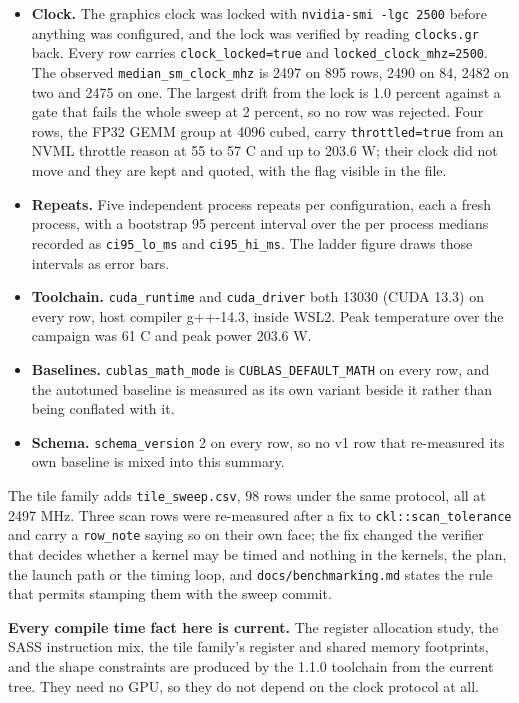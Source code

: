 \begin{itemize}
  \item \textbf{Clock.} The graphics clock was locked with
    \texttt{nvidia-smi -lgc 2500} before anything was configured, and the lock was
    verified by reading \texttt{clocks.gr} back. Every row carries
    \texttt{clock\_locked=true} and \texttt{locked\_clock\_mhz=2500}. The observed
    \texttt{median\_sm\_clock\_mhz} is 2497 on 895 rows, 2490 on 84, 2482 on two
    and 2475 on one. The largest drift from the lock is 1.0 percent against a gate
    that fails the whole sweep at 2 percent, so no row was rejected. Four rows, the
    FP32 GEMM group at 4096 cubed, carry \texttt{throttled=true} from an NVML
    throttle reason at 55 to 57 C and up to 203.6 W; their clock did not move and
    they are kept and quoted, with the flag visible in the file.
  \item \textbf{Repeats.} Five independent process repeats per configuration, each
    a fresh process, with a bootstrap 95 percent interval over the per process
    medians recorded as \texttt{ci95\_lo\_ms} and \texttt{ci95\_hi\_ms}. The ladder
    figure draws those intervals as error bars.
  \item \textbf{Toolchain.} \texttt{cuda\_runtime} and \texttt{cuda\_driver} both
    13030 (CUDA 13.3) on every row, host compiler g++-14.3, inside WSL2. Peak
    temperature over the campaign was 61 C and peak power 203.6 W.
  \item \textbf{Baselines.} \texttt{cublas\_math\_mode} is
    \texttt{CUBLAS\_DEFAULT\_MATH} on every row, and the autotuned baseline is
    measured as its own variant beside it rather than being conflated with it.
  \item \textbf{Schema.} \texttt{schema\_version} 2 on every row, so no v1 row that
    re-measured its own baseline is mixed into this summary.
\end{itemize}

The tile family adds \texttt{tile\_sweep.csv}, 98 rows under the same protocol, all
at 2497 MHz. Three scan rows were re-measured after a fix to
\texttt{ckl::scan\_tolerance} and carry a \texttt{row\_note} saying so on their own
face; the fix changed the verifier that decides whether a kernel may be timed and
nothing in the kernels, the plan, the launch path or the timing loop, and
\texttt{docs/benchmarking.md} states the rule that permits stamping them with the
sweep commit.

\textbf{Every compile time fact here is current.} The register allocation study, the
SASS instruction mix, the tile family's register and shared memory footprints, and
the shape constraints are produced by the 1.1.0 toolchain from the current tree. They
need no GPU, so they do not depend on the clock protocol at all.

